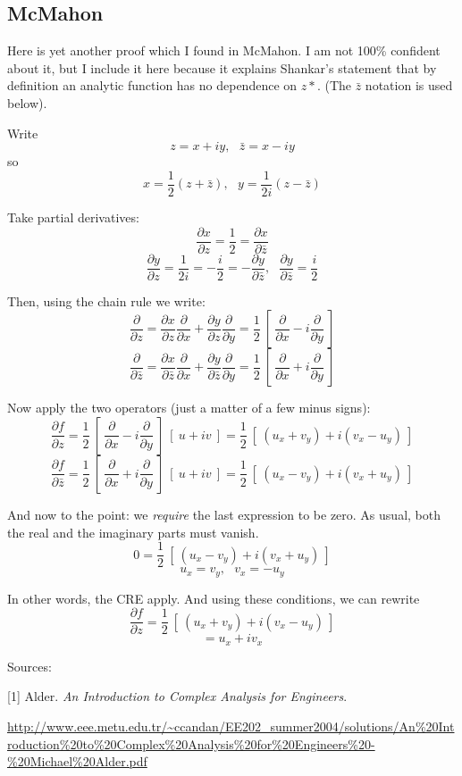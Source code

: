 \documentclass[11pt, oneside]{article}
\begin{document}
\subsection*{McMahon}
Here is yet another proof which I found in McMahon.  I am not 100\% confident about it, but I include it here because it explains Shankar's statement that by definition an analytic function has no dependence on $z*$.  (The $\bar{z}$ notation is used below).

Write
\[ z = x + iy , \ \ \  \bar{z} = x - iy \]
so
\[ x = \frac{1}{2} (z + \bar{z}) , \ \ \ y = \frac{1}{2i} (z - \bar{z}) \]

Take partial derivatives:
\[ \frac{\partial x}{\partial z} = \frac{1}{2} = \frac{\partial x}{\partial \bar{z}} \]
\[ \frac{\partial y}{\partial z} = \frac{1}{2i} = -\frac{i}{2} = -\frac{\partial y}{\partial \bar{z}} , \ \ \ \frac{\partial y}{\partial \bar{z}} = \frac{i}{2} \]

Then, using the chain rule we write:
\[ \frac{\partial}{\partial z} =  \frac{\partial x}{\partial z}  \frac{\partial}{\partial x} + \frac{\partial y}{\partial z}  \frac{\partial}{\partial y} = \frac{1}{2} \ [ \ \frac{\partial}{\partial x} - i \frac{\partial}{\partial y} \ ] \]
\[ \frac{\partial}{\partial \bar{z}} =  \frac{\partial x}{\partial \bar{z}}  \frac{\partial}{\partial x} + \frac{\partial y}{\partial \bar{z}}  \frac{\partial}{\partial y} = \frac{1}{2} \ [ \ \frac{\partial}{\partial x} + i \frac{\partial}{\partial y} \ ] \]

Now apply the two operators (just a matter of a few minus signs):
\[ \frac{\partial f}{\partial z} =  \frac{1}{2} \ [ \ \frac{\partial}{\partial x} - i \frac{\partial}{\partial y} \ ]  \ [ \ u + iv \ ] = \frac{1}{2} \ [ \ (u_x + v_y) + i( v_x - u_y) \ ] \]
\[ \frac{\partial f}{\partial \bar{z}} =  \frac{1}{2} \ [ \ \frac{\partial}{\partial x} + i \frac{\partial}{\partial y} \ ]  \ [ \ u + iv \ ] = \frac{1}{2} \ [ \ (u_x - v_y) + i( v_x + u_y) \ ] \]

And now to the point:  we \emph{require} the last expression to be zero.  As usual, both the real and the imaginary parts must vanish.
\[ 0 = \frac{1}{2} \ [ \ (u_x - v_y) + i( v_x + u_y) \ ] \]
\[ u_x = v_y, \ \ \ v_x = - u_y \]

In other words, the CRE apply.  And using these conditions, we can rewrite
\[ \frac{\partial f}{\partial z} = \frac{1}{2} \ [ \ (u_x + v_y) + i( v_x - u_y) \ ] \]
\[ = u_x +  iv_x \]

Sources:

[1] Alder.  \emph{An Introduction to Complex Analysis for Engineers}.

\url{http://www.eee.metu.edu.tr/~ccandan/EE202_summer2004/solutions/An%20Introduction%20to%20Complex%20Analysis%20for%20Engineers%20-%20Michael%20Alder.pdf}
\end{document}
